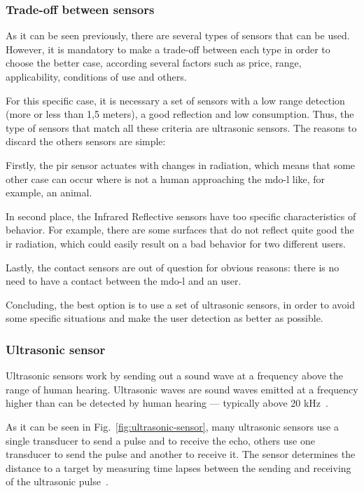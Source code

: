 \subsubsection{Trade-off between sensors}
As it can be seen previously, there are several types of sensors that can be used. However, it is mandatory to make a trade-off between each type in order to choose the better case, according several factors such as price, range, applicability, conditions of use and others.

For this specific case, it is necessary a set of sensors with a low range detection (more or less than 1,5 meters), a good reflection and low consumption. Thus, the type of sensors that match all these criteria are ultrasonic sensors.
The reasons to discard the others sensors are simple:

Firstly, the \gls{pir} sensor actuates with changes in radiation, which means that some other case can occur where is not a human approaching the \gls{mdo-l} like, for example, an animal.

In second place, the Infrared Reflective sensors have too specific characteristics of behavior. 
For example, there are some surfaces that do not reflect quite good the \gls{ir} radiation, which could easily result on a bad behavior for two different users.

Lastly, the contact sensors are out of question for obvious reasons: there is no need to have a contact between the \gls{mdo-l} and an user.

Concluding, the best option is to use a set of ultrasonic sensors, in order to avoid some specific situations and make the user detection as better as possible.

\subsubsection{Ultrasonic sensor}
Ultrasonic sensors work by sending out a sound wave at a frequency above the range of human hearing.
Ultrasonic waves are sound waves emitted at a frequency higher than can be detected by human hearing — typically above 20 kHz~\cite{ultrasonic-sensor-img}.

As it can be seen in Fig.~\ref{fig:ultrasonic-sensor}, many ultrasonic sensors use a single transducer to send a pulse and to receive the echo, others use one transducer to send the pulse and another to receive it.  
The sensor determines the distance to a target by measuring time lapses between the sending and receiving of the ultrasonic pulse~\cite{ultrasonic-sensor}.

